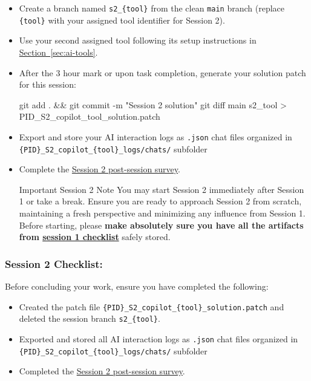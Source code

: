 \documentclass[11pt, a4paper]{article}
\begin{document}
\begin{itemize}
    \item Create a branch named \texttt{s2\_\{tool\}} from the clean \texttt{main} branch (replace \texttt{\{tool\}} with your assigned tool identifier for Session 2).
    \item Use your second assigned tool following its setup instructions in \hyperref[sec:ai-tools]{Section~\ref*{sec:ai-tools}}.
    \item After the 3 hour mark or upon task completion, generate your solution patch for this session:
    \begin{codebox}
git add . && git commit -m "Session 2 solution"     
git diff main s2_{tool} > {PID}_S2_copilot_{tool}_solution.patch
    \end{codebox}
    \item Export and store your AI interaction logs as \texttt{.json} chat files\newline
    organized in \texttt{\{PID\}\_S2\_copilot\_\{tool\}\_logs/chats/} subfolder
    \item Complete the \href{https://forms.gle/dPJY5vYg6XwU4T5b8}{Session 2 post-session survey}.
    
    \begin{mainbox}{Important Session 2 Note}
        You may start Session 2 immediately after Session 1 or take a break. Ensure you are ready to approach Session 2 from scratch, maintaining a fresh perspective and minimizing any influence from Session 1. Before starting, please \textbf{make absolutely sure you have all the artifacts from \hyperref[sec:session-1-checklist]{session 1 checklist}} safely stored.
    \end{mainbox}
\end{itemize}

\subsubsection*{Session 2 Checklist:}
\label{sec:session-2-checklist}
Before concluding your work, ensure you have completed the following:
\begin{itemize}
    \item Created the patch file \verb|{PID}_S2_copilot_{tool}_solution.patch| and deleted the session branch \verb|s2_{tool}|.
    \item Exported and stored all AI interaction logs as \verb|.json| chat files\newline
    organized in \verb|{PID}_S2_copilot_{tool}_logs/chats/| subfolder
    \item Completed the \href{https://forms.gle/dPJY5vYg6XwU4T5b8}{Session 2 post-session survey}.
\end{itemize}
\end{document}
